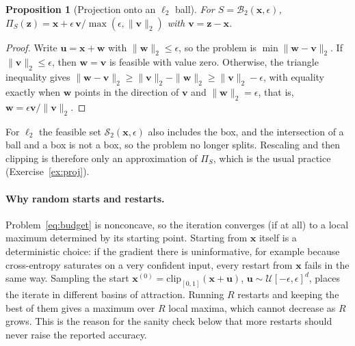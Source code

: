 \documentclass[10pt,a4paper]{extarticle}
\newtheorem{proposition}[theorem]{Proposition}
\theoremstyle{definition}
\newcommand{\x}{\mathbf{x}}
\newcommand{\B}{\mathcal{B}}
\newcommand{\Proj}{\Pi}
\begin{document}
\begin{proposition}[Projection onto an \(\ell_2\) ball]\label{prop:proj2}
For \(S=\B_2(\x,\epsilon)\), \(\Proj_S(\mathbf{z})=\x+\epsilon\,\mathbf{v}/\max(\epsilon,\|\mathbf{v}\|_2)\) with \(\mathbf{v}=\mathbf{z}-\x\).
\end{proposition}

\begin{proof}
Write \(\mathbf{u}=\x+\mathbf{w}\) with \(\|\mathbf{w}\|_2\le\epsilon\), so the problem is \(\min\|\mathbf{w}-\mathbf{v}\|_2\). If \(\|\mathbf{v}\|_2\le\epsilon\), then \(\mathbf{w}=\mathbf{v}\) is feasible with value zero. Otherwise, the triangle inequality gives \(\|\mathbf{w}-\mathbf{v}\|_2\ge\|\mathbf{v}\|_2-\|\mathbf{w}\|_2\ge\|\mathbf{v}\|_2-\epsilon\), with equality exactly when \(\mathbf{w}\) points in the direction of \(\mathbf{v}\) and \(\|\mathbf{w}\|_2=\epsilon\), that is, \(\mathbf{w}=\epsilon\mathbf{v}/\|\mathbf{v}\|_2\).
\end{proof}

For \(\ell_2\) the feasible set \(\mathcal{S}_2(\x,\epsilon)\) also includes the box, and the intersection of a ball and a box is not a box, so the problem no longer splits. Rescaling and then clipping is therefore only an approximation of \(\Proj_S\), which is the usual practice (Exercise~\ref{ex:proj}).

\paragraph{Why random starts and restarts.} Problem~\eqref{eq:budget} is nonconcave, so the iteration converges (if at all) to a local maximum determined by its starting point. Starting from \(\x\) itself is a deterministic choice: if the gradient there is uninformative, for example because cross-entropy saturates on a very confident input, every restart from \(\x\) fails in the same way. Sampling the start \(\x^{(0)}=\mathrm{clip}_{[0,1]}(\x+\mathbf{u})\), \(\mathbf{u}\sim\mathcal{U}[-\epsilon,\epsilon]^d\), places the iterate in different basins of attraction. Running \(R\) restarts and keeping the best of them gives a maximum over \(R\) local maxima, which cannot decrease as \(R\) grows. This is the reason for the sanity check below that more restarts should never raise the reported accuracy.
\end{document}
